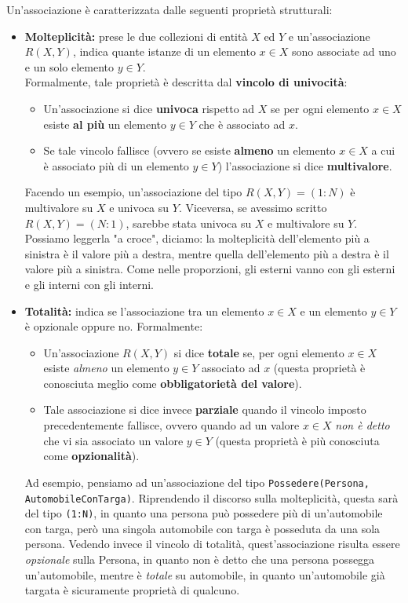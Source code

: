 \documentclass[12pt]{report}
\begin{document}
	Un'associazione è caratterizzata dalle seguenti proprietà strutturali:
	\begin{itemize}
		\item \textbf{Molteplicità:} prese le due collezioni di entità $X$ ed $Y$ e un'associazione $R(X, Y)$, indica quante istanze di un elemento $x \in X$ sono associate ad uno e un solo elemento $y \in Y$.\\
		Formalmente, tale proprietà è descritta dal \textbf{vincolo di univocità}:
		\begin{itemize}
			\item Un'associazione si dice \textbf{univoca} rispetto ad $X$ se per ogni elemento $x \in X$ esiste \textbf{al più} un elemento $y \in Y$ che è associato ad $x$.
			
			\item Se tale vincolo fallisce (ovvero se esiste \textbf{almeno} un elemento $x \in X$ a cui è associato più di un elemento $y \in Y$) l'associazione si dice \textbf{multivalore}.
		\end{itemize}
		
		Facendo un esempio, un'associazione del tipo $R(X, Y) = (1:N)$ è multivalore su $X$ e univoca su $Y$. Viceversa, se avessimo scritto $R(X, Y) = (N:1)$, sarebbe stata univoca su $X$ e multivalore su $Y$. Possiamo leggerla "a croce", diciamo: la molteplicità dell'elemento più a sinistra è il valore più a destra, mentre quella dell'elemento più a destra è il valore più a sinistra. Come nelle proporzioni, gli esterni vanno con gli esterni e gli interni con gli interni.
		
		\item \textbf{Totalità:} indica se l'associazione tra un elemento $x \in X$ e un elemento $y \in Y$ è opzionale oppure no. Formalmente:
		\begin{itemize}
			\item Un'associazione $R(X,Y)$ si dice \textbf{totale} se, per ogni elemento $x \in X$ esiste \textit{almeno} un elemento $y \in Y$ associato ad $x$ (questa proprietà è conosciuta meglio come \textbf{obbligatorietà del valore}).
			
			\item Tale associazione si dice invece \textbf{parziale} quando il vincolo imposto precedentemente fallisce, ovvero quando ad un valore $x \in X$ \textit{non è detto} che vi sia associato un valore $y \in Y$ (questa proprietà è più conosciuta come \textbf{opzionalità}).
		\end{itemize}
		
		Ad esempio, pensiamo ad un'associazione del tipo \texttt{Possedere(Persona, AutomobileConTarga)}. Riprendendo il discorso sulla molteplicità, questa sarà del tipo \texttt{(1:N)}, in quanto una persona può possedere più di un'automobile con targa, però una singola automobile con targa è posseduta da una sola persona. Vedendo invece il vincolo di totalità, quest'associazione risulta essere \textit{opzionale} sulla Persona, in quanto non è detto che una persona possegga un'automobile, mentre è \textit{totale} su automobile, in quanto un'automobile già targata è sicuramente proprietà di qualcuno.
	\end{itemize}
	
\end{document}
